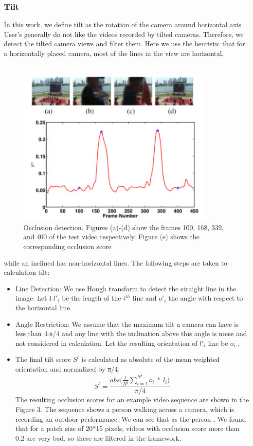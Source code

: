 \documentclass[conference]{IEEEtran}
\begin{document}
\subsubsection{Tilt}In this work, we define tilt as the rotation of the camera around
horizontal axis. User’s generally do not like the videos recorded
by tilted cameras. Therefore, we detect the tilted camera views
and filter them. Here we use the heuristic that for a horizontally
placed camera, most of the lines in the view are horizontal, \\\\
\begin{figure}
    \centering
    \includegraphics{img3.png}
    \caption{Occlusion detection. Figures (a)-(d) show the frames
100, 168, 339, and 400 of the test video respectively. Figure (e)
shows the corresponding occlusion score}
    \label{fig:my_label}
\end{figure}

while
an inclined has non-horizontal lines. The following steps are taken to calculation tilt:
\begin{itemize}
    \item Line Detection: We use Hough transform to detect the straight
line in the image. Let l ${l'_i}$ be the length of the ${i^{th}}$ line and 
${o'_i}$ the angle with respect to the horizontal line.\item Angle Restriction: We assume that the maximum tilt a camera can have is less than ±π/4 and any line with the inclination above this angle is noise and not considered in calculation. Let the resulting orientation of ${l'_i}$ line be ${o_i}$ .
    \item The final tilt score ${S^{t}}$ is calculated as absolute of the mean
weighted orientation and normalized by π/4:
\begin{equation}
S^t =  \frac{abs \big( \frac{1}{N^t} \sum_{i=1}^{N^l}o_i\ *\  l_i \big)}{\pi/4}
\end{equation}
The resulting occlusion scores for an example video sequence
are shown in the Figure 3. The sequence shows a person walking
across a camera, which is recording an outdoor performance. We
can see that as the person . We found that
for a patch size of 20*15 pixels, videos with occlusion score more
than 0.2 are very bad, so these are filtered in the framework.
\end{itemize}
\end{document}
